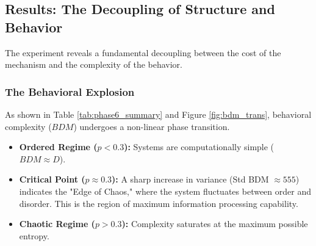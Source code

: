 \documentclass{article}
\begin{document}
\subsection{Results: The Decoupling of Structure and Behavior}
The experiment reveals a fundamental decoupling between the cost of the mechanism and the complexity of the behavior.

\begin{table}[H]
\centering
\caption{Phase 6 Summary: The Algorithmic Phase Transition ($N=20$)}
\label{tab:phase6_summary}
\end{table}

\subsubsection{The Behavioral Explosion}
As shown in Table \ref{tab:phase6_summary} and Figure \ref{fig:bdm_trans}, behavioral complexity ($BDM$) undergoes a non-linear phase transition.
\begin{itemize}
    \item \textbf{Ordered Regime ($p < 0.3$):} Systems are computationally simple ($BDM \approx D$).
    \item \textbf{Critical Point ($p \approx 0.3$):} A sharp increase in variance (Std BDM $\approx 555$) indicates the "Edge of Chaos," where the system fluctuates between order and disorder. This is the region of maximum information processing capability.
    \item \textbf{Chaotic Regime ($p > 0.3$):} Complexity saturates at the maximum possible entropy.
\end{itemize}
\end{document}

